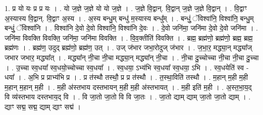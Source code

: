 \documentclass[17pt]{extarticle}
\begin{document}
1. प्र यो यः प्र प्र यः । . यो ज॒ज्ञे ज॒ज्ञे यो यो ज॒ज्ञे । . ज॒ज्ञे वि॒द्वान्. वि॒द्वान् ज॒ज्ञे ज॒ज्ञे वि॒द्वान् । . वि॒द्वाꣳ अ॒स्यास्य वि॒द्वान्. वि॒द्वाꣳ अ॒स्य । . अ॒स्य बन्धु॒म् बन्धु॑ म॒स्यास्य बन्धु᳚म् । . बन्धुं॒ ॅविश्वा॑नि॒ विश्वा॑नि॒ बन्धु॒म् बन्धुं॒ ॅविश्वा॑नि । . विश्वा॑नि दे॒वो दे॒वो विश्वा॑नि॒ विश्वा॑नि दे॒वः । . दे॒वो जनि॑मा॒ जनि॑मा दे॒वो दे॒वो जनि॑मा । . जनि॑मा विवक्ति विवक्ति॒ जनि॑मा॒ जनि॑मा विवक्ति । . वि॒व॒क्तीति॑ विवक्ति । . ब्रह्म॒ ब्रह्म॑णो॒ ब्रह्म॑णो॒ ब्रह्म॒ ब्रह्म॒ ब्रह्म॑णः । . ब्रह्म॑ण॒ उदुद् ब्रह्म॑णो॒ ब्रह्म॑ण॒ उत् । . उज् ज॑भार जभा॒रोदुज् ज॑भार । . ज॒भा॒र॒ मद्ध्या॒न् मद्ध्या᳚ज् जभार जभार॒ मद्ध्या᳚त् । . मद्ध्या᳚न् नी॒चा नी॒चा मद्ध्या॒न् मद्ध्या᳚न् नी॒चा । . नी॒चा दु॒च्चोच्चा नी॒चा नी॒चा दु॒च्चा । . उ॒च्चा स्व॒धया᳚ स्व॒धयो॒च्चोच्चा स्व॒धया᳚ । . स्व॒धया॒ ऽभ्य॑भि स्व॒धया᳚ स्व॒धया॒ ऽभि । . स्व॒धयेति॑ स्व - धया᳚ । . अ॒भि प्र प्राभ्य॑भि प्र । . प्र त॑स्थौ तस्थौ॒ प्र प्र त॑स्थौ । . त॒स्था॒विति॑ तस्थौ । . म॒हान् म॒ही म॒ही म॒हान् म॒हान् म॒ही । . म॒ही अ॑स्तभाय दस्तभायन् म॒ही म॒ही अ॑स्तभायत् । . म॒ही इति॑ म॒ही । . अ॒स्त॒भा॒य॒द् वि व्य॑स्तभाय दस्तभाय॒द् वि । . वि जा॒तो जा॒तो वि वि जा॒तः । . जा॒तो द्याम् द्याम् जा॒तो जा॒तो द्याम् । . द्याꣳ सद्म॒ सद्म॒ द्याम् द्याꣳ सद्म॑ । \newline
\end{document}
